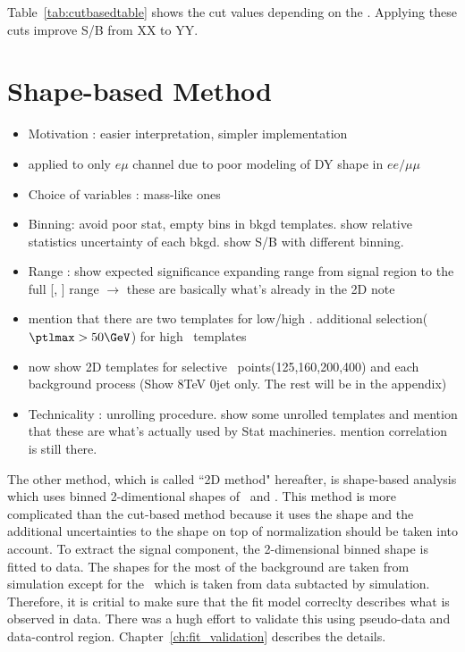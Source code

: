 Table~\ref{tab:cutbasedtable} shows the cut values depending on the \mHi. 
Applying these cuts improve S/B from XX to YY. 






\section{Shape-based Method}
\label{sec:shape}
\begin{itemize} 
\item Motivation : easier interpretation, simpler implementation  
\item applied to only $e\mu$ channel due to poor modeling of DY shape in $ee/\mu\mu$   
\item Choice of variables : mass-like ones
\item Binning: avoid poor stat, empty bins in bkgd templates. 
      show relative statistics uncertainty of each bkgd. 
      show S/B with different binning. 
\item Range : show expected significance expanding range from signal region to the full 
      [\mT, \mll] range $\rightarrow$ these are basically what's already in the 2D note 
\item mention that there are two templates for low/high \mHi. 
      additional selection($\ptlmax>50\GeV$) for high \mHi~templates
\item now show 2D templates for selective \mHi~points(125,160,200,400) and each background process
      (Show 8TeV 0jet only. The rest will be in the appendix)
\item Technicality : unrolling  procedure. show some unrolled templates and mention that 
      these are what's actually used by Stat machineries. mention correlation is still there. 
\end{itemize}  

The other method, which is called ``2D method" hereafter, 
is shape-based analysis which uses binned 2-dimentional shapes 
of \mT\ and \mll. This method is more complicated than the cut-based method
because it uses the shape and the additional uncertainties to the shape 
on top of normalization should be taken into account. 
To extract the signal component, the 2-dimensional binned shape is fitted to data. 
The shapes for the most of the background are taken from simulation except for 
the \Wjets\ which is taken from data subtacted by simulation. 
Therefore, it is critial to make sure that the fit model correclty describes 
what is observed in data. There was a hugh effort to validate this using 
pseudo-data and data-control region. Chapter~\ref{ch:fit_validation} describes 
the details. 

